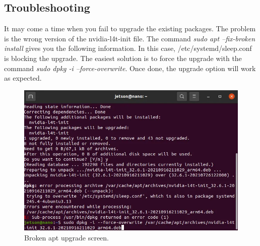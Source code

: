 \subsection{Troubleshooting}
It may come a time when you fail to upgrade the existing packages. The problem is the wrong version of the nvidia-l4t-init file. The command \textit{sudo apt --fix-broken install} gives you the following information. In this case, /etc/systemd/sleep.conf is blocking the upgrade. The easiest solution is to force the upgrade with the command \textit{sudo dpkg -i --force-overwrite}. Once done, the upgrade option will work as expected.
\begin{figure}[h]
    \centering
    \includegraphics[width=\textwidth]{figures/os_upgrades/fix_broken.PNG}
    \caption{Broken apt upgrade screen.}
\end{figure}
